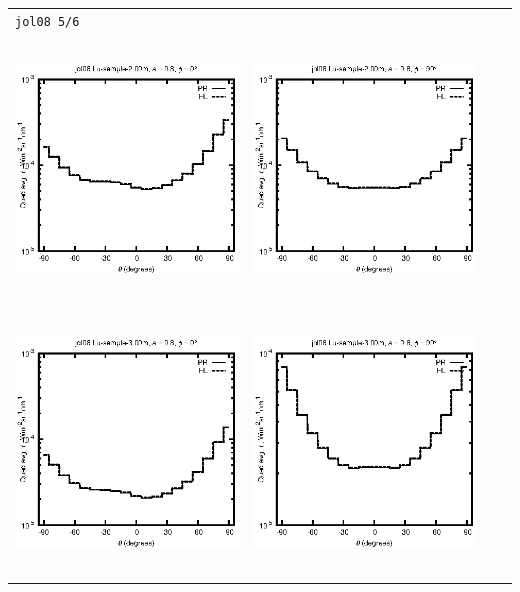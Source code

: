 \begin{tabular}{c c c c}
\multicolumn{4}{l}{\texttt{jol08 5/6}} \\
\includegraphics[height=7cm]{../eps/jol08_Lu_sample_2.00m_fwd.eps} &
\includegraphics[height=7cm]{../eps/jol08_Lu_sample_2.00m_cross.eps} \\
\includegraphics[height=7cm]{../eps/jol08_Lu_sample_3.00m_fwd.eps} &
\includegraphics[height=7cm]{../eps/jol08_Lu_sample_3.00m_cross.eps} \\

\end{tabular}

